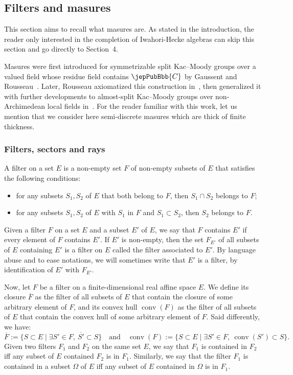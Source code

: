 \subsection{Filters and masures}
This section aims to recall what masures are. As stated in the introduction, the reader only interested in the completion of Iwahori-Hecke algebras can skip this section and go directly to Section~4.

Masures were first introduced for symmetrizable split Kac--Moody groups over a valued field whose residue field contains $\jepPubBbb{C}$ by Gaussent and Rousseau~\cite{jep88refGR08}. Later, Rousseau axiomatized this construction in~\cite{jep88refRou11}, then generalized it with further developments to almost-split Kac--Moody groups over non-Archimedean local fields in~\cite{jep88refRou16,jep88refRou17}. For the reader familiar with this work, let us mention that we consider here semi-discrete masures which are thick of finite thickness.
\subsubsection{Filters, sectors and rays}
\begin{definition}\label{jep88localDefinition2_2}
A filter on a set $E$ is a non-empty set $F$ of non-empty subsets of $E$ that satisfies the following conditions:
\begin{itemize}
\item for any subsets $S_1,S_2$ of $E$ that both belong to $F$, then $S_1\cap S_2$ belongs to $F$;
\item for any subsets $S_1,S_2$ of $E$ with $S_1$ in $F$ and $S_1\subset S_2$, then $S_2$ belongs to $F$.
\end{itemize}
\end{definition}
Given a filter $F$ on a set $E$ and a subset $E'$ of $E$, we say that $F$ contains $E'$ if every element of $F$ contains $E'$. If $E'$ is non-empty, then the set $F_{E'}$ of all subsets of $E$ containing $E'$ is a filter on $E$ called the filter associated to $E'$. By language abuse and to ease notations, we will sometimes write that $E'$ is a filter, by identification of $E'$ with $F_{E'}$.

Now, let $F$ be a filter on a finite-dimensional real affine space $E$. We define its closure $\overline{F}$ as the filter of all subsets of $E$ that contain the closure of some arbitrary element of $F$, and its convex hull $\operatorname{conv}(F)$ as the filter of all subsets of $E$ that contain the convex hull of some arbitrary element of $F$. Said differently, we have:
\[
\overline{F}:=\{S\subset E\mid\exists S'\in F,\ \overline{S'}\subset S\}\quad\text{and}\quad\operatorname{conv}(F):=\{S\subset E\mid\exists S'\in F,\ \operatorname{conv}(S')\subset S\}.
\]
Given two filters $F_1$ and $F_2$ on the same set $E$, we say that $F_1$ is contained in $F_2$ iff any subset of $E$ contained $F_2$ is in $F_1$. Similarly, we say that the filter $F_1$ is contained in a subset $\Omega$ of $E$ iff any subset of $E$ contained in $\Omega$ is in $F_1$.

